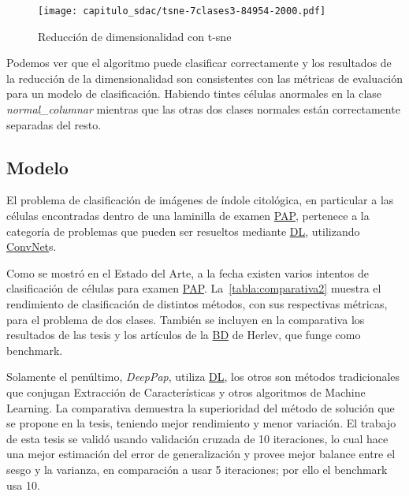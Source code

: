\begin{figure}[H]
    \centering
    \texttt{[image: capitulo\_sdac/tsne-7clases3-84954-2000.pdf]}
    \caption{Reducción de dimensionalidad con t-sne}\label{fig:tsne}
\end{figure}

Podemos ver que el algoritmo puede clasificar correctamente y los resultados de
la reducción de la dimensionalidad son consistentes con las métricas de
evaluación para un modelo de clasificación. Habiendo tintes células anormales en
la clase \emph{normal\_columnar} mientras que las otras dos clases normales
están correctamente separadas del resto.

\subsection{Modelo}

El problema de clasificación de imágenes de índole citológica, en particular a
las células encontradas dentro de una laminilla de examen \hyperlink{abbr}{PAP}, pertenece
a la categoría de problemas que pueden ser resueltos mediante \hyperlink{abbr}{DL},
utilizando \hyperlink{abbr}{ConvNet}s.

Como se mostró en el Estado del Arte, a la fecha existen varios intentos de
clasificación de células para examen \hyperlink{abbr}{PAP}.
La~\autoref{tabla:comparativa2} muestra el rendimiento de clasificación de
distintos métodos, con sus respectivas métricas, para el problema de dos clases.
También se incluyen en la comparativa los resultados de las tesis y los
artículos de la \hyperlink{abbr}{BD} de Herlev, que funge como benchmark.

Solamente el penúltimo, \emph{DeepPap}, utiliza \hyperlink{abbr}{DL}, los otros
son métodos tradicionales que conjugan Extracción de Características y otros
algoritmos de Machine Learning. La comparativa demuestra la superioridad del
método de solución que se propone en la tesis, teniendo mejor rendimiento y
menor variación. El trabajo de esta tesis se validó usando validación cruzada de
10 iteraciones, lo cual hace una mejor estimación del error de generalización y
provee mejor balance entre el sesgo y la varianza, en comparación a usar 5
iteraciones; por ello el benchmark usa 10.

